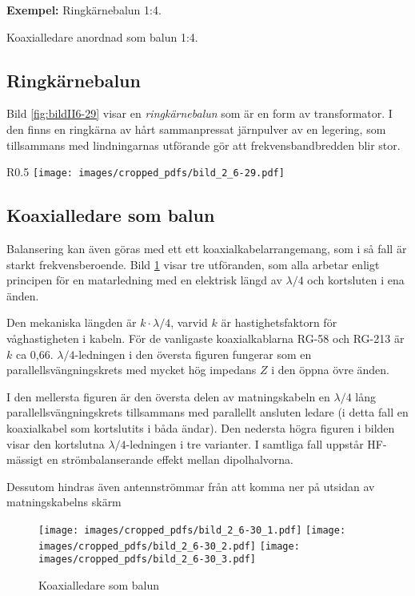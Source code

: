 \textbf{Exempel:}
Ringkärnebalun 1:4.

Koaxialledare anordnad som balun 1:4.

\subsection{Ringkärnebalun}

Bild \ref{fig:bildII6-29} visar en \emph{ringkärnebalun} som är en form av
transformator.
I den finns en ringkärna av hårt sammanpressat järnpulver av en legering, som
tillsammans med lindningarnas utförande gör att frekvensbandbredden blir stor.

\begin{wrapfigure}{R}{0.5\textwidth}
  \texttt{[image: images/cropped\_pdfs/bild\_2\_6-29.pdf]}
  \caption{Ringkärnebalun}
  \label{fig:bildII6-29}
\end{wrapfigure}

\subsection{Koaxialledare som balun}

Balansering kan även göras med ett ett koaxialkabelarrangemang, som i
så fall är starkt frekvensberoende.
Bild \ref{fig:bildII6-30} visar tre utföranden, som alla arbetar enligt
principen för en matarledning med en elektrisk längd av \(\lambda/4\) och
kortsluten i ena änden.

Den mekaniska längden är \(k\cdot\lambda/4\), varvid \(k\) är hastighetsfaktorn
för våghastigheten i kabeln.
För de vanligaste koaxialkablarna RG-58 och RG-213 är \(k\) ca 0,66.
\(\lambda/4\)-ledningen i den översta figuren fungerar som en
parallellsvängningskrets med mycket hög impedans \(Z\) i den öppna övre änden.

I den mellersta figuren är den översta delen av matningskabeln en
\(\lambda/4\) lång parallellsvängningskrets tillsammans med parallellt
ansluten ledare (i detta fall en koaxialkabel som kortslutits i båda ändar).
Den nedersta högra figuren i bilden visar den kortslutna
\(\lambda/4\)-ledningen i tre varianter.
I samtliga fall uppstår HF-mässigt en strömbalanserande effekt mellan
dipolhalvorna.

Dessutom hindras även antennströmmar från att komma ner på utsidan av
matningskabelns skärm

\begin{figure}
  \texttt{[image: images/cropped\_pdfs/bild\_2\_6-30\_1.pdf]}
  \texttt{[image: images/cropped\_pdfs/bild\_2\_6-30\_2.pdf]}
  \texttt{[image: images/cropped\_pdfs/bild\_2\_6-30\_3.pdf]}
  \caption{Koaxialledare som balun}
  \label{fig:bildII6-30}
\end{figure}

